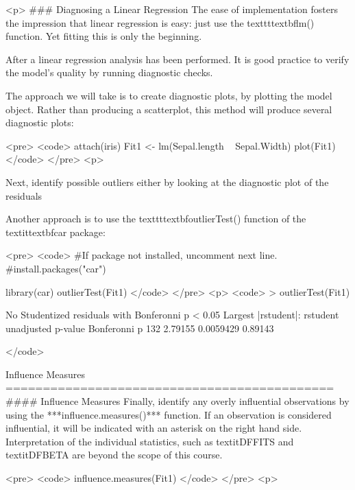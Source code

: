

<p>
### {Diagnosing a Linear Regression}
The ease of implementation fosters the impression that linear regression is easy: just use the texttt{textbf{lm()}} function. Yet fitting
this is only the beginning.

After a linear regression analysis has been performed. It is good practice to verify the model’s quality
by running diagnostic checks.

The approach we will take is to create diagnostic plots, by plotting the model object. Rather than producing a scatterplot, this method will produce several diagnostic plots:

<pre>
<code>
attach(iris)
Fit1 <- lm(Sepal.length ~ Sepal.Width)
plot(Fit1)
</code> 
</pre>
<p>

Next, identify possible outliers either by looking at the diagnostic plot of the residuals

Another approach is to use the texttt{textbf{outlierTest()}} function of the textit{textbf{car}} package:


<pre>
<code>
#If package not installed, uncomment next line.
#install.packages("car")

library(car)
outlierTest(Fit1)
</code> 
</pre>
<p>
<code>
> outlierTest(Fit1)

No Studentized residuals with Bonferonni p < 0.05
Largest |rstudent|:
    rstudent unadjusted p-value Bonferonni p
132  2.79155          0.0059429      0.89143

</code>

Influence Measures
============================================
#### {Influence Measures}
Finally, identify any overly influential observations by using the ***influence.measures()***
function.
If an observation is considered influential, it will be indicated with an asterisk on the right hand side. Interpretation of the individual statistics, such as textit{DFFITS} and textit{DFBETA} are beyond the scope of this course.

<pre>
<code>
influence.measures(Fit1)
</code> 
</pre>
<p>
